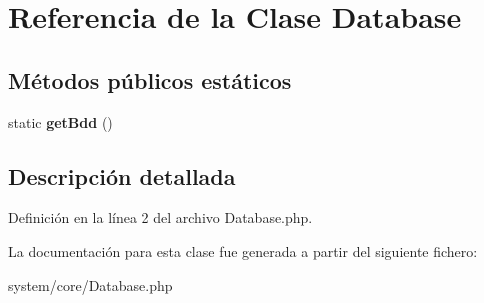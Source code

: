 \hypertarget{class_database}{}\section{Referencia de la Clase Database}
\label{class_database}
\subsection*{Métodos públicos estáticos}
\begin{DoxyCompactItemize}
\item 
\mbox{\label{class_database_aa9a1dcc0705102af94199c656a3086ce}} 
static {\bfseries get\+Bdd} ()
\end{DoxyCompactItemize}


\subsection{Descripción detallada}


Definición en la línea 2 del archivo Database.\+php.



La documentación para esta clase fue generada a partir del siguiente fichero\+:\begin{DoxyCompactItemize}
\item 
system/core/Database.\+php\end{DoxyCompactItemize}

